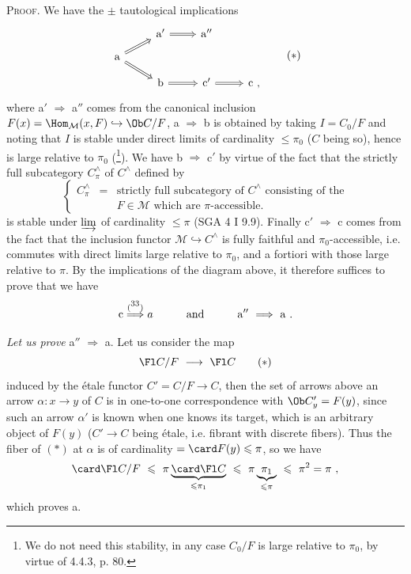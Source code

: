 \textsc{Proof}. We have the $\pm$ tautological implications
\[
\begin{tikzcd}[row sep=small]
 & \mathrm{a}' \arrow[r, Rightarrow] & \mathrm{a}'' & \\
\mathrm{a} \arrow[ur, Rightarrow] \arrow[dr, Rightarrow] & & & \\
 & \mathrm{b} \arrow[r, Rightarrow] & \mathrm{c}' \arrow[r, Rightarrow] & \mathrm{c}\ ,
\end{tikzcd}
\tag*{$(*)$}
\]
where a$'$ $\Longrightarrow$ a$''$ comes from the canonical inclusion $F(x) = \Hom_{\mathcal{M}}(x,F) \hookrightarrow \Ob C/F$, a $\Longrightarrow$ b is obtained by taking $I = C_0/F$ and noting that $I$ is stable under direct limits of cardinality $\leqslant \pi_0$ ($C$ being so), hence is large relative to $\pi_0$ (\footnote{We do not need this stability, in any case $C_0/F$ is large relative to $\pi_0$, by virtue of 4.4.3, p. 80.}). We have b $\Longrightarrow$ c$'$ by virtue of the fact that the strictly full subcategory $C^{\wedge}_{\pi}$ of $C^{\wedge}$ defined by
\[
\left\{
\begin{array}{lcl}
C^{\wedge}_{\pi} & = & \text{strictly full subcategory of } C^{\wedge} \text{ consisting of the}\\
 & & F \in \mathcal{M} \text{ which are } \pi\text{-accessible.}
\end{array}
\right.
\tag*{(4.5.2.2)}
\]
is stable under $\varinjlim$ of cardinality $\leqslant \pi$ (SGA 4 I 9.9). Finally c$'$ $\Longrightarrow$ c comes from the fact that the inclusion functor $\mathcal{M} \hookrightarrow C^{\wedge}$ is fully faithful and $\pi_0$-accessible, i.e. commutes with direct limits large relative to $\pi_0$, and a fortiori with those large relative to $\pi$. By the implications of the diagram above, it therefore suffices to prove that we have
\[
\mathrm{c} \overset{(\mbox{\footnotemark[33]})}{\Longrightarrow} a \qquad\quad \text{and} \qquad\quad \mathrm{a}'' \ \Longrightarrow\ \mathrm{a}\ .
\]
\setcounter{footnote}{33}


\textit{Let us prove} a$''$ $\Longrightarrow$ a. Let us consider the map
\[
\Fl C/F \ \longrightarrow\ \Fl C
\tag*{$(*)$}
\]
induced by the étale functor $C' = C/F \longrightarrow C$, then the set of arrows above an %
arrow $\alpha : x \longrightarrow y$ of $C$ is in one-to-one correspondence with $\Ob C'_y = F(y)$, since such an arrow $\alpha'$ is known when one knows its target, which is an arbitrary object of $F(y)$ ($C' \longrightarrow C$ being étale, i.e. fibrant with discrete fibers). Thus the fiber of $(*)$ at $\alpha$ is of %
cardinality $= \card F(y) \leqslant \pi$, so we have
\[
\card\Fl C/F \ \leqslant\ \pi \underbrace{\card\Fl C}_{\leqslant \pi_1} \ \leqslant\ \pi \underbrace{\ \pi_1\ }_{\leqslant \pi} \ \leqslant\ \pi^2 = \pi\ ,
\]
which proves a.

